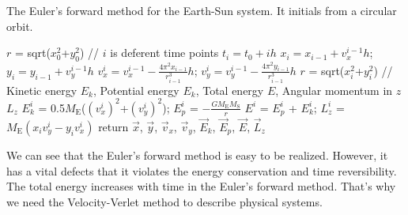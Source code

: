 \begin{algorithm}[tb]
	\caption{The Euler's forward method for the Earth-Sun system. It initials from a circular orbit.}
	\label{alg::euler}
	$r$ = sqrt($x_0^2$+$y_0^2$)\;
	// $i$ is deferent time points $t_i=t_0+ih$\;
    { $x_{i} = x_{i-1} + v_x^{{i-1}}h$;
    $y_{i} = y_{i-1} + v_y^{{i-1}}h$\;
    $v_x^{i} = v_x^{i-1} - \frac{4\pi^2x_{i-1}}{r_{i-1}^3}h$;
    $v_y^{i} = v_y^{i-1} - \frac{4\pi^2y_{i-1}}{r_{i-1}^3}h$\;
    $r$ = sqrt($x_i^2$+$y_i^2$)\;
    // Kinetic energy $E_k$, Potential energy $E_k$, Total energy $E$, Angular momentum in $\hat{z}$ $L_z$\;
    $E_k^i$ = 0.5$M_{\mathrm{E}}$($(v_x^{i})^2$+$(v_y^{i})^2$);
    $E_p^i$ = $-\frac{GM_{\mathrm{E}}M_{\mathrm{S}}}{r}$\;
    $E^i$ = $E_p^i$ + $E_k^i$;
    $L_z^i$ = $M_{\mathrm{E}}(x_iv_y^{i}-y_iv_x^{i})$\;
    }
	return $\vec{x}$, $\vec{y}$, $\vec{v}_x$, $\vec{v}_y$, $\vec{E}_k$, $\vec{E}_p$, $\vec{E}$, $\vec{L}_z$\;
\end{algorithm}

We can see that the Euler's forward method is easy to be realized.
 However, it has a vital defects that it violates the energy conservation and time reversibility.
 The total energy increases with time in the Euler's forward method.
 That's why we need the Velocity-Verlet method to describe physical systems.
